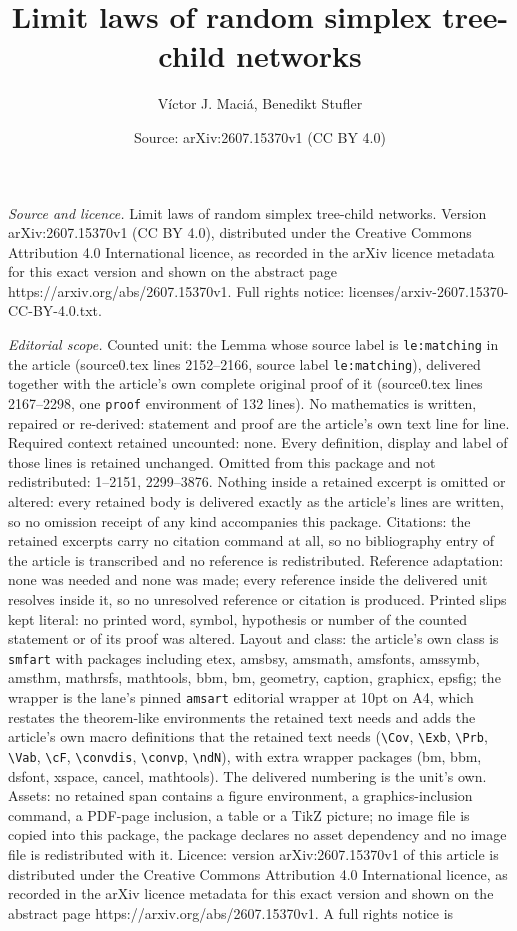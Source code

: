 \documentclass[10pt,a4paper]{amsart}
\title[Limit laws of random simplex tree-child networks]{Limit laws of random simplex tree-child networks}
\author{V\'ictor J. Maci\'a, Benedikt Stufler}
\date{Source: arXiv:2607.15370v1 (CC BY 4.0)}
\begin{document}
\maketitle

\noindent\emph{Source and licence.} Limit laws of random simplex tree-child networks. Version arXiv:2607.15370v1 (CC BY 4.0), distributed under the Creative Commons Attribution 4.0 International licence, as recorded in the arXiv licence metadata for this exact version and shown on the abstract page https://arxiv.org/abs/2607.15370v1. Full rights notice: licenses/arxiv-2607.15370-CC-BY-4.0.txt.\par\smallskip

\noindent\textit{Editorial scope.} Counted unit: the Lemma whose source label is \texttt{le:matching} in the article (source0.tex lines 2152--2166, source label \texttt{le:matching}), delivered together with the article's own complete original proof of it (source0.tex lines 2167--2298, one \texttt{proof} environment of 132 lines). No mathematics is written, repaired or re-derived: statement and proof are the article's own text line for line. Required context retained uncounted: none. Every definition, display and label of those lines is retained unchanged. Omitted from this package and not redistributed: 1--2151, 2299--3876. Nothing inside a retained excerpt is omitted or altered: every retained body is delivered exactly as the article's lines are written, so no omission receipt of any kind accompanies this package. Citations: the retained excerpts carry no citation command at all, so no bibliography entry of the article is transcribed and no reference is redistributed. Reference adaptation: none was needed and none was made; every reference inside the delivered unit resolves inside it, so no unresolved reference or citation is produced. Printed slips kept literal: no printed word, symbol, hypothesis or number of the counted statement or of its proof was altered. Layout and class: the article's own class is \texttt{smfart} with packages including etex, amsbsy, amsmath, amsfonts, amssymb, amsthm, mathrsfs, mathtools, bbm, bm, geometry, caption, graphicx, epsfig; the wrapper is the lane's pinned \texttt{amsart} editorial wrapper at 10pt on A4, which restates the theorem-like environments the retained text needs and adds the article's own macro definitions that the retained text needs (\texttt{\textbackslash Cov}, \texttt{\textbackslash Exb}, \texttt{\textbackslash Prb}, \texttt{\textbackslash Vab}, \texttt{\textbackslash cF}, \texttt{\textbackslash convdis}, \texttt{\textbackslash convp}, \texttt{\textbackslash ndN}), with extra wrapper packages (bm, bbm, dsfont, xspace, cancel, mathtools). The delivered numbering is the unit's own. Assets: no retained span contains a figure environment, a graphics-inclusion command, a PDF-page inclusion, a table or a TikZ picture; no image file is copied into this package, the package declares no asset dependency and no image file is redistributed with it. Licence: version arXiv:2607.15370v1 of this article is distributed under the Creative Commons Attribution 4.0 International licence, as recorded in the arXiv licence metadata for this exact version and shown on the abstract page https://arxiv.org/abs/2607.15370v1. A full rights notice is 
\end{document}
